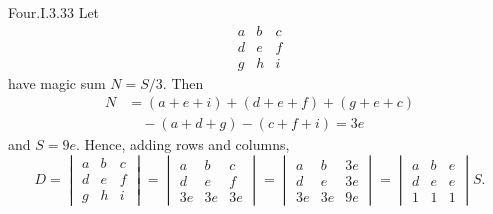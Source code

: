 \begin{ans}{Four.I.3.33}
      \answerasgiven
      Let
      \begin{equation*}
        \begin{array}{ccc}
          a  &b  &c  \\
          d  &e  &f  \\
          g  &h  &i
        \end{array}
      \end{equation*}
      have magic sum \( N=S/3 \).
      Then
      \begin{align*}
        N
        &=(a+e+i)+(d+e+f)+(g+e+c)   \\
        &\quad\text{}-(a+d+g)-(c+f+i)=3e
      \end{align*}
      and \( S=9e \).
      Hence, adding rows and columns,
      \begin{equation*}
        D=
        \begin{vmatrix}
          a  &b  &c  \\
          d  &e  &f  \\
          g  &h  &i
        \end{vmatrix}
        =\begin{vmatrix}
          a  &b  &c  \\
          d  &e  &f  \\
         3e  &3e &3e
        \end{vmatrix}
        =\begin{vmatrix}
          a  &b  &3e \\
          d  &e  &3e \\
         3e  &3e &9e
        \end{vmatrix}
        =\begin{vmatrix}
          a  &b  &e  \\
          d  &e  &e  \\
          1  &1  &1
        \end{vmatrix}S.
      \end{equation*}
    
\end{ans}
